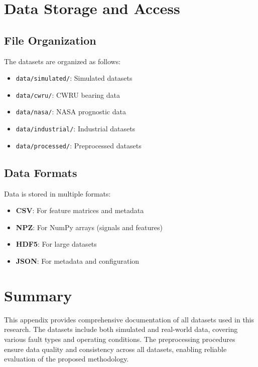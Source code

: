 \section{Data Storage and Access}

\subsection{File Organization}

The datasets are organized as follows:
\begin{itemize}
    \item \texttt{data/simulated/}: Simulated datasets
    \item \texttt{data/cwru/}: CWRU bearing data
    \item \texttt{data/nasa/}: NASA prognostic data
    \item \texttt{data/industrial/}: Industrial datasets
    \item \texttt{data/processed/}: Preprocessed datasets
\end{itemize}

\subsection{Data Formats}

Data is stored in multiple formats:
\begin{itemize}
    \item \textbf{CSV}: For feature matrices and metadata
    \item \textbf{NPZ}: For NumPy arrays (signals and features)
    \item \textbf{HDF5}: For large datasets
    \item \textbf{JSON}: For metadata and configuration
\end{itemize}

\section{Summary}

This appendix provides comprehensive documentation of all datasets used in this research. The datasets include both simulated and real-world data, covering various fault types and operating conditions. The preprocessing procedures ensure data quality and consistency across all datasets, enabling reliable evaluation of the proposed methodology.
